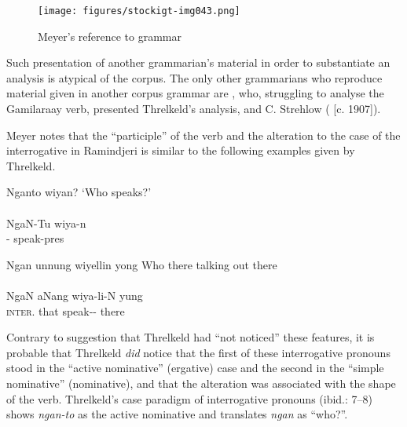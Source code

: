 \begin{figure}
\texttt{[image: figures/stockigt-img043.png]}
\caption{Meyer’s reference to  grammar \citeyearpar[40]{meyer_vocabulary_1843}}
\label{fig:key:102}
\end{figure}

Such presentation of another grammarian’s material in order to substantiate an analysis is atypical of the corpus. The only other grammarians who reproduce material given in another corpus grammar are \citet[76]{ridley_kamilaroi_1855-1}, who, struggling to analyse the Gamilaraay verb, presented Threlkeld’s analysis, and C. Strehlow (\citeyear{strehlow_untitled_1931} [c. 1907]).

Meyer notes that the “participle” of the verb and the alteration to the case of the interrogative in Ramindjeri is similar to the following examples given by Threlkeld.

\ea\label{ex:key:42}
	Nganto wiyan? 
	\glt `Who speaks?' \\
	\citep[127]{Threlkeld1834} \\
	\gll NgaN-Tu wiya-n \\
	-   speak-pres \\
\z

\ea\label{ex:key:43}
	Ngan                  unnung                wiyellin                       yong 
	\glt Who there talking out there \\
	\citep[127]{Threlkeld1834} \\
	\gll NgaN                   aNang       wiya-li-N          yung \\
	\textsc{inter}.      that        speak--    there\footnotemark\\
\z

Contrary to  suggestion that Threlkeld had “not noticed” these features, it is probable that Threlkeld \textit{did} notice that the first of these interrogative pronouns stood in the “active nominative” (ergative) case and the second in the “simple nominative” (nominative), and that the alteration was associated with the shape of the verb. Threlkeld’s case paradigm of interrogative pronouns (ibid.: 7--8) shows \textit{ngan-to} as the active nominative and translates \textit{ngan} as ``who?''.

